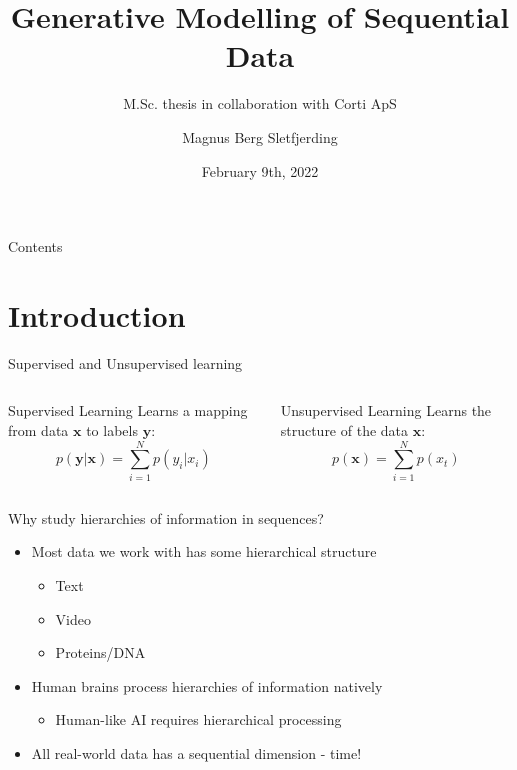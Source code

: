 \documentclass[
  ignorenonframetext,
  aspectratio=169,
]{beamer}
\title{Generative Modelling of Sequential Data}
\subtitle{M.Sc. thesis in collaboration with Corti ApS}
\author{Magnus Berg Sletfjerding}
\date{February 9th, 2022}
\providecommand{\tightlist}{%
  \setlength{\itemsep}{0pt}\setlength{\parskip}{0pt}}
\begin{document}
\frame{\titlepage}

\begin{frame}{Contents}
\protect\hypertarget{contents}{}
\tableofcontents
\end{frame}

\hypertarget{introduction}{%
\section{Introduction}\label{introduction}}

\begin{frame}{Supervised and Unsupervised learning}
\protect\hypertarget{supervised-and-unsupervised-learning}{}
\begin{figure}
\centering
\resizebox{!}{0.5\textheight}{

}\end{figure}

\begin{columns}[T]
\begin{column}{0.48\textwidth}
\begin{block}{Supervised Learning}
\protect\hypertarget{supervised-learning}{}
Learns a mapping from data \(\mathbf{x}\) to labels \(\mathbf{y}\):\\
\[
p(\mathbf{y}|\mathbf{x}) = \sum^N_{i=1} p(y_i| x_i)
\]
\end{block}
\end{column}

\begin{column}{0.48\textwidth}
\begin{block}{Unsupervised Learning}
\protect\hypertarget{unsupervised-learning}{}
Learns the structure of the data \(\mathbf{x}\): \[
p(\mathbf{x}) = \sum^N_{i=1} p(x_t)
\]
\end{block}
\end{column}
\end{columns}
\end{frame}

\begin{frame}{Why study hierarchies of information in sequences?}
\protect\hypertarget{why-study-hierarchies-of-information-in-sequences}{}
\begin{itemize}
\item
  Most data we work with has some hierarchical structure

  \begin{itemize}
  \tightlist
  \item
    Text
  \item
    Video
  \item
    Proteins/DNA
  \end{itemize}
\item
  Human brains process hierarchies of information natively

  \begin{itemize}
  \tightlist
  \item
    Human-like AI requires hierarchical processing
  \end{itemize}
\item
  All real-world data has a sequential dimension - time!
\end{itemize}
\end{frame}
\end{document}
